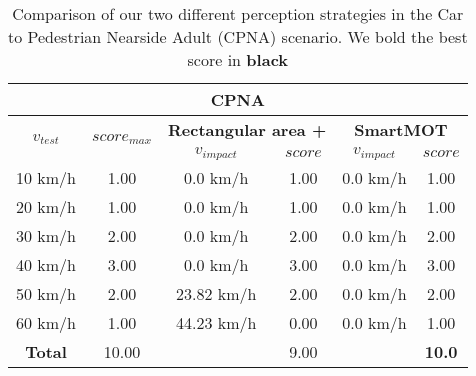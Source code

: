 \begin{table}[]
	\centering
	\caption{Comparison of our two different perception strategies in the Car to Pedestrian Nearside Adult (CPNA) scenario. We bold the best score in \textbf{black}}
	\label{table:CPNA_results}
	\begin{tabular}{c | c | c  c | c  c  } 
		\hline 
		\multicolumn{6}{c}{\textbf{CPNA}}\\
		\hline \hline
		\multirow{2}{*}{\textbf{\(v_{test}\)}} & \multirow{2}{*}{\textbf{\(score_{max}\)}} & \multicolumn{2}{c}{\textbf{Rectangular area + \cite{gomez2020real}}} & \multicolumn{2}{c}{\textbf{SmartMOT}} \\ 
		& & \(v_{impact}\) & \(score\) & \(v_{impact}\) & \(score\) \\
		\hline
		10 km/h & 1.00 & 0.0 km/h & 1.00 & 0.0 km/h & 1.00 \\
		20 km/h & 1.00 & 0.0 km/h & 1.00 & 0.0 km/h & 1.00 \\
		30 km/h & 2.00 & 0.0 km/h & 2.00 & 0.0 km/h & 2.00 \\
		40 km/h & 3.00 & 0.0 km/h & 3.00 & 0.0 km/h & 3.00 \\
		50 km/h & 2.00 & 23.82 km/h & 2.00 & 0.0 km/h & 2.00 \\
		60 km/h & 1.00 & 44.23 km/h & 0.00 & 0.0 km/h & 1.00  \\
		\hline \hline
		\textbf{Total} & 10.00 &  & 9.00 & & \textbf{10.0} \\
		\hline
	\end{tabular}
\end{table}


